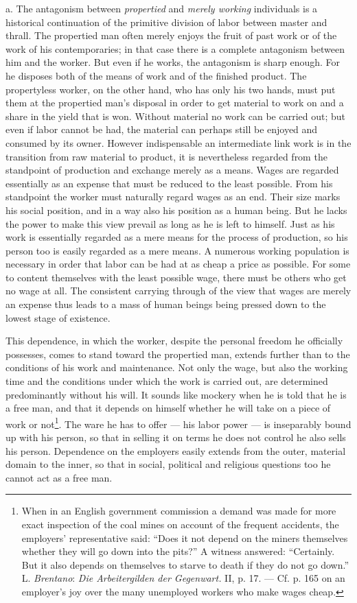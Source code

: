\documentclass[12pt,a4paper,openany]{book}
\newcommand{\opage}[1]{\marginnote{\footnotesize\textit{[#1]}}}
\begin{document}
a. The antagonism between \textit{propertied} and \textit{merely working} individuals is a historical continuation of
the primitive division of labor between master and thrall. The propertied man often merely enjoys the fruit of past work
or of the work of his contemporaries; in that case there is a complete antagonism between him and the worker. But even
if he works, the antagonism is sharp enough. For he disposes both of the means of work and of the finished product. The
propertyless worker, on the other hand, who has only his two hands, must put them at the propertied man's disposal in
order to get material to work on and a share in the yield that is won. Without material no work can be carried out; but
even if labor cannot be had, the material can perhaps still be enjoyed and consumed by its owner. However indispensable
an intermediate link work is in the transition from raw material to product, it is nevertheless regarded from the
standpoint of production and exchange merely as a means. Wages are regarded essentially as an expense that must be
reduced to the least possible. From his standpoint the worker must naturally regard wages as an end. Their size marks his
social position, and in a way also his position as a human being. But he lacks the power to make this view prevail as
long as he is left to himself. Just as his work is essentially regarded as a mere means for the process of production, so
his person too is
\opage{362}easily regarded as a mere means. A numerous working population is necessary in order that labor can be had
at as cheap a price as possible. For some to content themselves with the least possible wage, there must be others who
get no wage at all. The consistent carrying through of the view that wages are merely an expense thus leads to a mass of
human beings being pressed down to the lowest stage of existence.

This dependence, in which the worker, despite the personal freedom he officially possesses, comes to stand toward the
propertied man, extends further than to the conditions of his work and maintenance. Not only the wage, but also the
working time and the conditions under which the work is carried out, are determined predominantly without his will. It
sounds like mockery when he is told that he is a free man, and that it depends on himself whether he will take on a piece
of work or not\footnote[1]{When in an English government commission a demand was made for more exact inspection of the
coal mines on account of the frequent accidents, the employers' representative said: ``Does it not depend on the miners
themselves whether they will go down into the pits?'' A witness answered: ``Certainly. But it also depends on themselves
to starve to death if they do not go down.''%
L. \emph{Brentano}: \textit{Die Arbeitergilden der Gegenwart.} II, p. 17. --- Cf. p. 165 on an employer's joy over the
many unemployed workers who make wages cheap.}. The ware he has to offer --- his labor power --- is inseparably bound up
with his person, so that in selling it on terms he does not control he also sells his person. Dependence on the employers
easily extends from the outer, material domain to the inner, so that in social, political and religious questions too he
cannot act as a free man.
\end{document}
